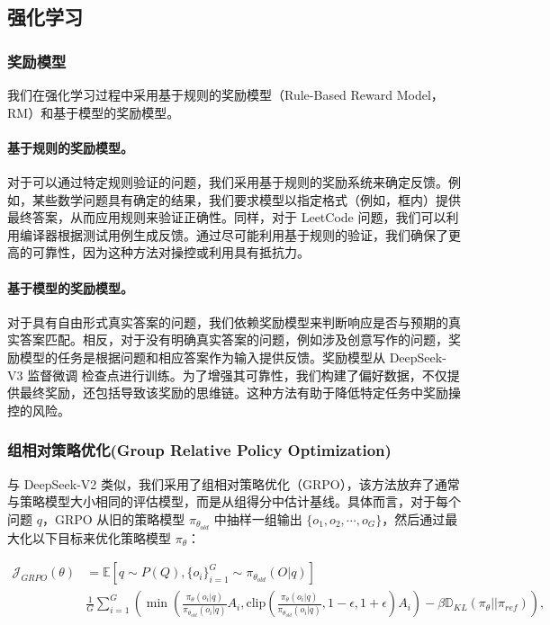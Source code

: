 \documentclass[lang=cn,a4paper,newtx]{elegantpaper}
\newcommand{\dsvii}{DeepSeek-V2}
\newcommand{\dsviii}{DeepSeek-V3}
\begin{document}
\subsection{强化学习}

\subsubsection{奖励模型}

我们在强化学习过程中采用基于规则的奖励模型（Rule-Based Reward Model，RM）和基于模型的奖励模型。

\paragraph{基于规则的奖励模型。}
对于可以通过特定规则验证的问题，我们采用基于规则的奖励系统来确定反馈。例如，某些数学问题具有确定的结果，我们要求模型以指定格式（例如，框内）提供最终答案，从而应用规则来验证正确性。同样，对于 LeetCode 问题，我们可以利用编译器根据测试用例生成反馈。通过尽可能利用基于规则的验证，我们确保了更高的可靠性，因为这种方法对操控或利用具有抵抗力。

\paragraph{基于模型的奖励模型。}
对于具有自由形式真实答案的问题，我们依赖奖励模型来判断响应是否与预期的真实答案匹配。相反，对于没有明确真实答案的问题，例如涉及创意写作的问题，奖励模型的任务是根据问题和相应答案作为输入提供反馈。奖励模型从 \dsviii{} 监督微调 检查点进行训练。为了增强其可靠性，我们构建了偏好数据，不仅提供最终奖励，还包括导致该奖励的思维链。这种方法有助于降低特定任务中奖励操控的风险。

\subsubsection{组相对策略优化(Group Relative Policy Optimization)}

与 \dsvii{} 类似，我们采用了组相对策略优化（GRPO），该方法放弃了通常与策略模型大小相同的评估模型，而是从组得分中估计基线。具体而言，对于每个问题 $q$，GRPO 从旧的策略模型 $\pi_{\theta_{old}}$ 中抽样一组输出 $\{o_1, o_2, \cdots, o_G\}$，然后通过最大化以下目标来优化策略模型 $\pi_{\theta}$：

\begin{equation}
\begin{split}
    \mathcal{J}_{GRPO}(\theta) &= \mathbb{E}{[q \sim P(Q), \{o_i\}_{i=1}^G \sim \pi_{\theta_{old}}(O|q)]}  \\
    & \frac{1}{G}\sum_{i=1}^G \left( \min \left( \frac{\pi_\theta(o_i |q)}{\pi_{\theta_{old}}(o_i |q)} A_i, \text{clip} \left( \frac{\pi_\theta(o_i |q)}{\pi_{\theta_{old}}(o_i |q)}, 1 - \epsilon, 1 + \epsilon \right)  A_i \right) - \beta \mathbb{D}_{KL}\left(\pi_{\theta} || \pi_{ref}\right)\right) ,
\end{split}
\label{eq:GRPO-obj}
\end{equation}
\end{document}
